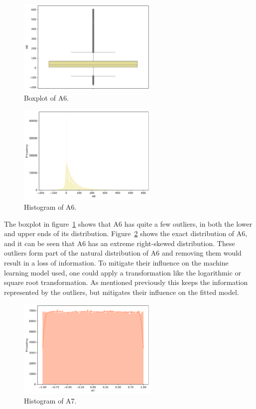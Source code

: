 \documentclass[11pt]{report}
\begin{document}
\begin{figure}[H]
    \centering
    \includegraphics[width=0.6\textwidth]{images/A6_boxplot.pdf}
    \caption{Boxplot of A6.}
    \label{fig:a6_boxplot}
\end{figure}

\begin{figure}[H]
    \centering
    \includegraphics[width=0.6\textwidth]{images/A6_histplot.pdf}
    \caption{Histogram of A6.}
    \label{fig:a6_histplot}
\end{figure}

The boxplot in figure~\ref{fig:a6_boxplot} shows that A6 has quite a few outliers, in both the lower and upper ends of its distribution. Figure~\ref{fig:a6_histplot} shows the exact distribution of A6, and it can be seen that A6 has an extreme right-skewed distribution. These outliers form part of the natural distribution of A6 and removing them would result in a loss of information. To mitigate their influence on the machine learning model used, one could apply a transformation like the logarithmic or square root transformation. As mentioned previously this keeps the information represented by the outliers, but mitigates their influence on the fitted model.

\begin{figure}[H]
    \centering
    \includegraphics[width=0.6\textwidth]{images/A7_histplot.pdf}
    \caption{Histogram of A7.}
    \label{fig:a7_histplot}
\end{figure}
\end{document}
